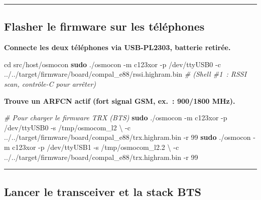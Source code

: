 \documentclass[
]{article}
\newenvironment{Shaded}{\begin{snugshade}}{\end{snugshade}}
\newcommand{\AttributeTok}[1]{\textcolor[rgb]{0.13,0.29,0.53}{#1}}
\newcommand{\BuiltInTok}[1]{#1}
\newcommand{\CommentTok}[1]{\textcolor[rgb]{0.56,0.35,0.01}{\textit{#1}}}
\newcommand{\DataTypeTok}[1]{\textcolor[rgb]{0.13,0.29,0.53}{#1}}
\newcommand{\FunctionTok}[1]{\textcolor[rgb]{0.13,0.29,0.53}{\textbf{#1}}}
\newcommand{\NormalTok}[1]{#1}
\begin{document}
\begin{center}\rule{0.5\linewidth}{0.5pt}\end{center}

\subsection{Flasher le firmware sur les
téléphones}\label{flasher-le-firmware-sur-les-tuxe9luxe9phones}

\textbf{Connecte les deux téléphones via USB-PL2303, batterie retirée.}

\begin{Shaded}
\begin{Highlighting}[]
\BuiltInTok{cd}\NormalTok{ src/host/osmocon}
\FunctionTok{sudo}\NormalTok{ ./osmocon }\AttributeTok{{-}m}\NormalTok{ c123xor }\AttributeTok{{-}p}\NormalTok{ /dev/ttyUSB0 }\AttributeTok{{-}c}\NormalTok{ ../../target/firmware/board/compal\_e88/rssi.highram.bin}
\CommentTok{\# (Shell \#1 : RSSI scan, contrôle{-}C pour arrêter)}
\end{Highlighting}
\end{Shaded}

\textbf{Trouve un ARFCN actif (fort signal GSM, ex.~: 900/1800 MHz).}

\begin{Shaded}
\begin{Highlighting}[]
\CommentTok{\# Pour charger le firmware TRX (BTS)}
\FunctionTok{sudo}\NormalTok{ ./osmocon }\AttributeTok{{-}m}\NormalTok{ c123xor }\AttributeTok{{-}p}\NormalTok{ /dev/ttyUSB0 }\AttributeTok{{-}s}\NormalTok{ /tmp/osmocom\_l2 }\DataTypeTok{\textbackslash{}}
  \AttributeTok{{-}c}\NormalTok{ ../../target/firmware/board/compal\_e88/trx.highram.bin }\AttributeTok{{-}r}\NormalTok{ 99}
\FunctionTok{sudo}\NormalTok{ ./osmocon }\AttributeTok{{-}m}\NormalTok{ c123xor }\AttributeTok{{-}p}\NormalTok{ /dev/ttyUSB1 }\AttributeTok{{-}s}\NormalTok{ /tmp/osmocom\_l2.2 }\DataTypeTok{\textbackslash{}}
  \AttributeTok{{-}c}\NormalTok{ ../../target/firmware/board/compal\_e88/trx.highram.bin }\AttributeTok{{-}r}\NormalTok{ 99}
\end{Highlighting}
\end{Shaded}

\begin{center}\rule{0.5\linewidth}{0.5pt}\end{center}

\subsection{Lancer le transceiver et la stack
BTS}\label{lancer-le-transceiver-et-la-stack-bts}
\end{document}
